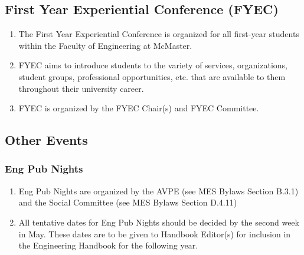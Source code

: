 \begin{enumerate}
\begin{enumerate}
\end{enumerate}

\hypertarget{first-year-experiential-conference-fyec}{%
 \subsection{First Year Experiential Conference
  (FYEC)}
 \label{first-year-experiential-conference-fyec}}
\begin{enumerate}
 \item
  The First Year Experiential Conference is organized for all first-year
  students within the Faculty of Engineering at McMaster.
 \item
  FYEC aims to introduce students to the variety of services,
  organizations, student groups, professional opportunities, etc. that
  are available to them throughout their university career.
 \item
  FYEC is organized by the FYEC Chair(s) and FYEC Committee.

\end{enumerate}

\hypertarget{other-events}{%
 \subsection{Other Events}
 \label{other-events}}

\hypertarget{eng-pub-nights}{%
 \subsubsection{Eng Pub Nights}
 \label{eng-pub-nights}}
\begin{enumerate}
 \item
  Eng Pub Nights are organized by the AVPE (see MES Bylaws Section
  B.3.1) and the Social Committee (see MES Bylaws Section D.4.11)
 \item
  All tentative dates for Eng Pub Nights should be decided by the second
  week in May. These dates are to be given to Handbook Editor(s) for
  inclusion in the Engineering Handbook for the following year.
\end{enumerate}

% 